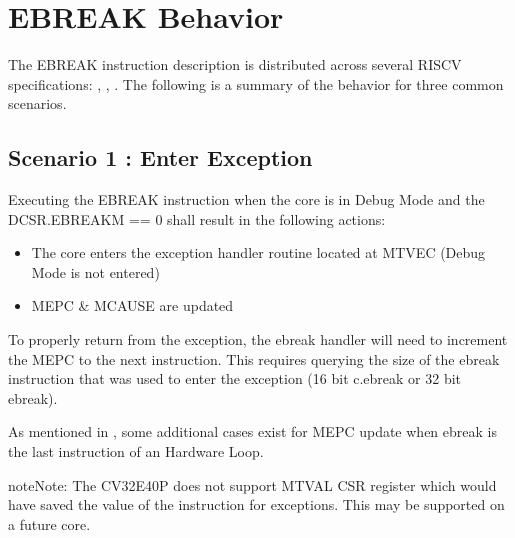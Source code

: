 \documentclass[letterpaper,10pt,english]{sphinxmanual}
\begin{document}
\section{EBREAK Behavior}
\label{\detokenize{debug:ebreak-behavior}}\label{\detokenize{debug:id3}}
\sphinxAtStartPar
The EBREAK instruction description is distributed across several RISC\sphinxhyphen{}V specifications: ,
,
. The following is a summary of the behavior for three common scenarios.


\subsection{Scenario 1 : Enter Exception}
\label{\detokenize{debug:scenario-1-enter-exception}}\label{\detokenize{debug:ebreak-scenario-1}}
\sphinxAtStartPar
Executing the EBREAK instruction when the core is  in Debug Mode and the DCSR.EBREAKM == 0 shall result in the following actions:
\begin{itemize}
\item {} 
\sphinxAtStartPar
The core enters the exception handler routine located at MTVEC (Debug Mode is not entered)

\item {} 
\sphinxAtStartPar
MEPC \& MCAUSE are updated

\end{itemize}

\sphinxAtStartPar
To properly return from the exception, the ebreak handler will need to increment the MEPC to the next instruction.
This requires querying the size of the ebreak instruction that was used to enter the exception (16 bit c.ebreak or 32 bit ebreak).

\sphinxAtStartPar
As mentioned in {\hyperref[\detokenize{corev_hw_loop:hwloop-exceptions-handlers}]{}}, some additional cases exist for MEPC update when ebreak is the last instruction of an Hardware Loop.

\begin{sphinxadmonition}{note}{Note:}
\sphinxAtStartPar
The CV32E40P does not support MTVAL CSR register which would have saved the value of the instruction for exceptions. This may be supported on a future core.
\end{sphinxadmonition}
\end{document}
